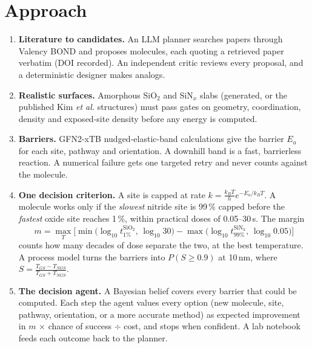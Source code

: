 \documentclass[10pt]{article}
\newcommand{\SiO}{SiO$_2$}
\newcommand{\SiN}{SiN$_x$}
\begin{document}
\section*{Approach}
\begin{enumerate}
  \item \textbf{Literature to candidates.} An LLM planner searches papers through Valency BOND and proposes molecules, each quoting a retrieved paper verbatim (DOI recorded). An independent critic reviews every proposal, and a deterministic designer makes analogs.
  \item \textbf{Realistic surfaces.} Amorphous \SiO{} and \SiN{} slabs (generated, or the published Kim \emph{et al.} structures) must pass gates on geometry, coordination, density and exposed-site density before any energy is computed.
  \item \textbf{Barriers.} GFN2-xTB nudged-elastic-band calculations give the barrier $E_a$ for each site, pathway and orientation. A downhill band is a fast, barrierless reaction. A numerical failure gets one targeted retry and never counts against the molecule.
  \item \textbf{One decision criterion.} A site is capped at rate $k=\frac{k_BT}{h}e^{-E_a/k_BT}$. A molecule works only if the \emph{slowest} nitride site is 99\,\% capped before the \emph{fastest} oxide site reaches 1\,\%, within practical doses of 0.05--30\,s. The margin
  \[
    m=\max_T\Big[\min\big(\log_{10}t^{\mathrm{SiO_2}}_{1\%},\,\log_{10}30\big)-\max\big(\log_{10}t^{\mathrm{SiN_x}}_{99\%},\,\log_{10}0.05\big)\Big]
  \]
  counts how many decades of dose separate the two, at the best temperature. A process model turns the barriers into $P(S\ge0.9)$ at 10\,nm, where $S=\frac{T_{GS}-T_{NGS}}{T_{GS}+T_{NGS}}$.
  \item \textbf{The decision agent.} A Bayesian belief covers every barrier that could be computed. Each step the agent values every option (new molecule, site, pathway, orientation, or a more accurate method) as expected improvement in $m$ $\times$ chance of success $\div$ cost, and stops when confident. A lab notebook feeds each outcome back to the planner.
\end{enumerate}
\end{document}
